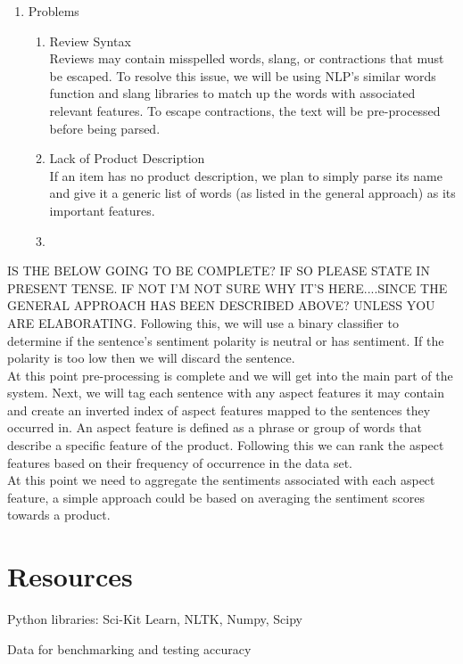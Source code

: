 \documentclass{article}
\begin{document}
\begin{enumerate}
\item Problems 
	\begin{enumerate} [label* = \arabic*.]
	\item Review Syntax \\
	Reviews may contain misspelled words, slang, or contractions that must be escaped. To resolve this issue, we will be using NLP's similar words function and slang libraries to match up the words with associated relevant features. To escape contractions, the text will be pre-processed before being parsed.
	\item Lack of Product Description \\
	If an item has no product description, we plan to simply parse its name and give it a generic list of words (as listed in the general approach) as its important features.
	\item 
	\end{enumerate}
\end{enumerate}

IS THE BELOW GOING TO BE COMPLETE? IF SO PLEASE STATE IN PRESENT TENSE. IF NOT I'M NOT SURE WHY IT'S HERE....SINCE THE GENERAL APPROACH HAS BEEN DESCRIBED ABOVE? UNLESS YOU ARE ELABORATING. 
Following this, we will use a binary classifier to determine if the sentence's sentiment polarity is neutral or has sentiment. If the polarity is too low then we will discard the sentence. \\
At this point pre-processing is complete and we will get into the main part of the system. Next, we will tag each sentence with any aspect features it may contain and create an inverted index of aspect features mapped to the sentences they occurred in. An aspect feature is defined as a phrase or group of words that describe a specific feature of the product. Following this we can rank the aspect features based on their frequency of occurrence in the data set.\\
At this point we need to aggregate the sentiments associated with each aspect feature, a simple approach could be based on averaging the sentiment scores towards a product.\\

\section{Resources}

Python libraries: Sci-Kit Learn, NLTK, Numpy, Scipy

Data for benchmarking and testing accuracy
\end{document}
